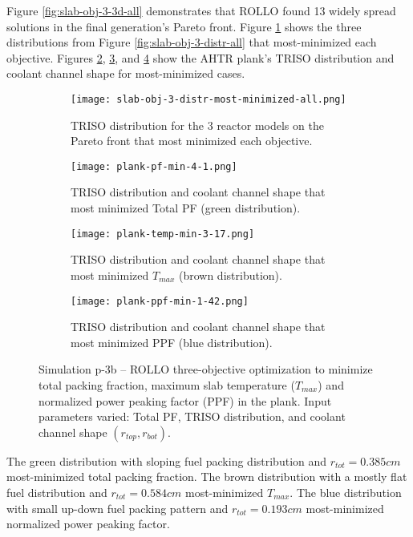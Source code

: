 Figure \ref{fig:slab-obj-3-3d-all} demonstrates that \gls{ROLLO} found 13 widely spread 
solutions in the final generation's Pareto front. 
Figure \ref{fig:slab-obj-3-distr-most-minimized-distr-all} shows the three distributions 
from Figure \ref{fig:slab-obj-3-distr-all} that most-minimized each objective. 
Figures \ref{fig:slab-obj-3-distr-most-minimized-pf-all}, \ref{fig:slab-obj-3-distr-most-minimized-temp-all}, 
and \ref{fig:slab-obj-3-distr-most-minimized-ppf-all} show the \gls{AHTR} plank's TRISO 
distribution and coolant channel shape for most-minimized cases. 
\begin{figure}[htbp]
    \begin{subfigure}{\textwidth}
        \texttt{[image: slab-obj-3-distr-most-minimized-all.png]}
        \caption{TRISO distribution for the 3 reactor models on the Pareto 
        front that most minimized each objective.}
        \label{fig:slab-obj-3-distr-most-minimized-distr-all}
    \end{subfigure}
    \begin{subfigure}{\textwidth}
        \texttt{[image: plank-pf-min-4-1.png]}
        \caption{TRISO distribution and coolant channel shape that most minimized Total 
        PF (green distribution).}
        \label{fig:slab-obj-3-distr-most-minimized-pf-all}
    \end{subfigure}
    \begin{subfigure}{\textwidth}
        \texttt{[image: plank-temp-min-3-17.png]}
        \caption{TRISO distribution and coolant channel shape that most minimized 
        $T_{max}$ (brown distribution).}
        \label{fig:slab-obj-3-distr-most-minimized-temp-all}
    \end{subfigure}
    \begin{subfigure}{\textwidth}
        \texttt{[image: plank-ppf-min-1-42.png]}
        \caption{TRISO distribution and coolant channel shape that most minimized PPF
        (blue distribution).}
        \label{fig:slab-obj-3-distr-most-minimized-ppf-all}
    \end{subfigure}
    \caption{Simulation p-3b -- ROLLO three-objective optimization to minimize total 
    packing fraction, maximum slab temperature ($T_{max}$) and normalized power peaking 
    factor (PPF) in the plank. 
    Input parameters varied: Total PF, TRISO distribution, and coolant channel shape 
    $(r_{top}, r_{bot})$.}
    \label{fig:slab-obj-3-distr-most-minimized-all}
\end{figure}
The green distribution with sloping fuel packing distribution and $r_{tot} = 0.385cm$ 
most-minimized total packing fraction. 
The brown distribution with a mostly flat fuel distribution and $r_{tot} = 0.584cm$ 
most-minimized $T_{max}$. 
The blue distribution with small up-down fuel packing pattern and $r_{tot} = 0.193cm$ 
most-minimized normalized power peaking factor. 


